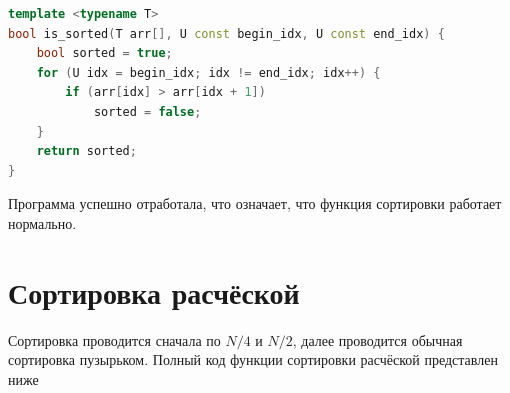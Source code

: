 \documentclass[a4paper,12pt]{article}
\begin{document}
\begin{lstlisting}[language=C++]
template <typename T>
bool is_sorted(T arr[], U const begin_idx, U const end_idx) {
    bool sorted = true;
    for (U idx = begin_idx; idx != end_idx; idx++) {
        if (arr[idx] > arr[idx + 1])
            sorted = false;
    }
    return sorted;
}
\end{lstlisting}

Программа успешно отработала, что означает, что функция сортировки работает нормально.



\section*{Сортировка расчёской}

Сортировка проводится сначала по $N/4$ и $N/2$, далее проводится обычная сортировка пузырьком. Полный код функции сортировки расчёской представлен ниже
\end{document}
